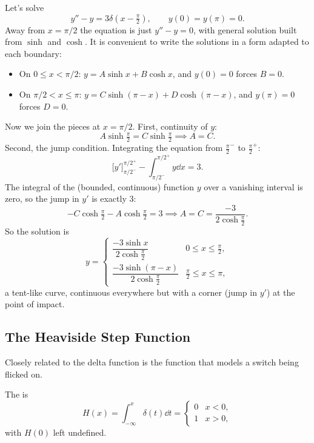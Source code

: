 \begin{example}
	Let's solve
	$$
	y'' - y = 3 \delta\left(x - \tfrac \pi 2\right), \qquad y(0) = y(\pi) = 0.
	$$
	Away from $x = \pi/2$ the equation is just $y'' - y = 0$, with general solution built from $\sinh$ and $\cosh$. It is convenient to write the solutions in a form adapted to each boundary:
	\begin{itemize}
		\item On $0 \leq x < \pi/2$: $y = A \sinh x + B \cosh x$, and $y(0) = 0$ forces $B = 0$.
		\item On $\pi/2 < x \leq \pi$: $y = C \sinh(\pi - x) + D\cosh(\pi - x)$, and $y(\pi) = 0$ forces $D = 0$.
	\end{itemize}
	Now we join the pieces at $x = \pi/2$. First, continuity of $y$:
	$$
	A \sinh \tfrac\pi2 = C \sinh \tfrac \pi 2 \implies A = C.
	$$
	Second, the jump condition. Integrating the equation from $\frac\pi2^-$ to $\frac\pi2^+$:
	$$
	\big[y'\big]_{\pi/2^-}^{\pi/2^+} - \int_{\pi/2^-}^{\pi/2^+} y \dd x = 3.
	$$
	The integral of the (bounded, continuous) function $y$ over a vanishing interval is zero, so the jump in $y'$ is exactly $3$:
	$$
	-C \cosh \tfrac\pi2 - A \cosh \tfrac\pi2 = 3 \implies A = C = \frac{-3}{2\cosh \frac\pi2}.
	$$
	So the solution is
	$$
	y = \begin{cases} \dfrac{-3 \sinh x}{2 \cosh \frac\pi2} & 0 \leq x \leq \frac\pi2, \\[8pt] \dfrac{-3\sinh(\pi - x)}{2\cosh\frac\pi2} & \frac\pi2 \leq x \leq \pi, \end{cases}
	$$
	a tent-like curve, continuous everywhere but with a corner (jump in $y'$) at the point of impact.
\end{example}

\subsection{The Heaviside Step Function}

Closely related to the delta function is the function that models a switch being flicked on.

\begin{definition}
	The  is
	$$
	H(x) = \int_{-\infty}^{x} \delta(t) \dd t = \begin{cases} 0 & x < 0, \\ 1 & x > 0, \end{cases}
	$$
	with $H(0)$ left undefined.
\end{definition}

